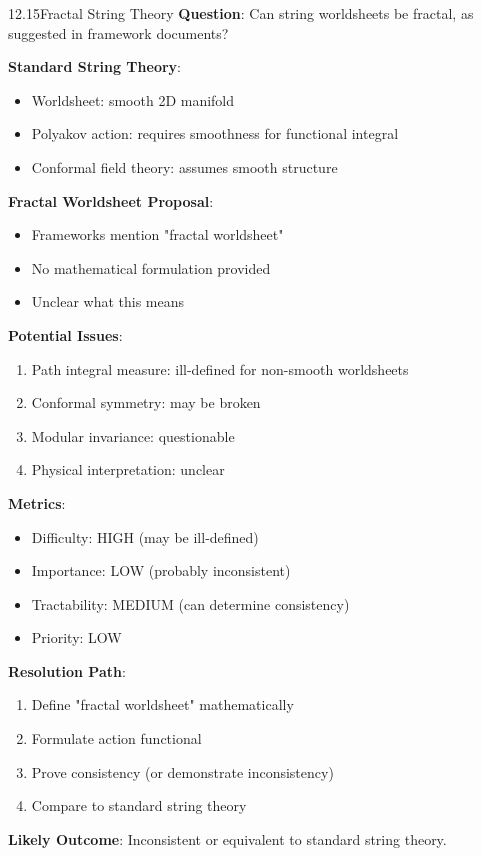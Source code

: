 \begin{openproblem}{12.15}{Fractal String Theory}
\textbf{Question}: Can string worldsheets be fractal, as suggested in framework documents?

\textbf{Standard String Theory}:
\begin{itemize}
    \item Worldsheet: smooth 2D manifold
    \item Polyakov action: requires smoothness for functional integral
    \item Conformal field theory: assumes smooth structure
\end{itemize}

\textbf{Fractal Worldsheet Proposal}:
\begin{itemize}
    \item Frameworks mention "fractal worldsheet"
    \item No mathematical formulation provided
    \item Unclear what this means
\end{itemize}

\textbf{Potential Issues}:
\begin{enumerate}
    \item Path integral measure: ill-defined for non-smooth worldsheets
    \item Conformal symmetry: may be broken
    \item Modular invariance: questionable
    \item Physical interpretation: unclear
\end{enumerate}

\textbf{Metrics}:
\begin{itemize}
    \item Difficulty: HIGH (may be ill-defined)
    \item Importance: LOW (probably inconsistent)
    \item Tractability: MEDIUM (can determine consistency)
    \item Priority: LOW
\end{itemize}

\textbf{Resolution Path}:
\begin{enumerate}
    \item Define "fractal worldsheet" mathematically
    \item Formulate action functional
    \item Prove consistency (or demonstrate inconsistency)
    \item Compare to standard string theory
\end{enumerate}

\textbf{Likely Outcome}: Inconsistent or equivalent to standard string theory.
\end{openproblem}

